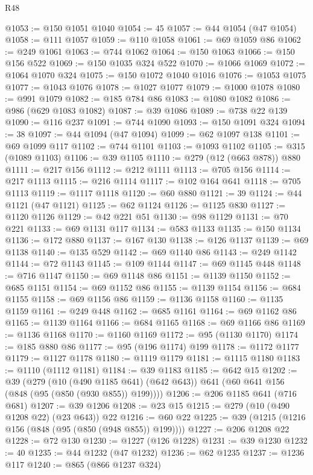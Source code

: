 \begin{lexlean}{R48}
\begin{coremodule}
@1053 := @150 @1051 @1040
@1054 := 45
@1057 := @44 @1054 (@47 @1054)
@1058 := @111 @1057
@1059 := @110 @1058
@1061 := @69 @1059 @86
@1062 := @249 @1061
@1063 := @744 @1062
@1064 := @150 @1063
@1066 := @150 @156 @522
@1069 := @150 @1035 @324 @522
@1070 := @1066 @1069
@1072 := @1064 @1070 @324
@1075 := @150 @1072 @1040 @1016
@1076 := @1053 @1075
@1077 := @1043 @1076
@1078 := @1027 @1077
@1079 := @1000 @1078
@1080 := @991 @1079
@1082 := @185 @784 @86
@1083 := @1080 @1082
@1086 := @986 (@629 @1083 @1082)
@1087 := @39 @1086
@1089 := @738 @22 @139
@1090 := @116 @237
@1091 := @744 @1090
@1093 := @150 @1091 @324
@1094 := 38
@1097 := @44 @1094 (@47 @1094)
@1099 := @62 @1097 @138
@1101 := @69 @1099 @117
@1102 := @744 @1101
@1103 := @1093 @1102
@1105 := @315 (@1089 @1103)
@1106 := @39 @1105
@1110 := @279 (@12 (@663 @878)) @880
@1111 := @217 @156
@1112 := @212 @1111
@1113 := @705 @156
@1114 := @217 @1113
@1115 := @216 @1114
@1117 := @102 @164 @641
@1118 := @705 @1113
@1119 := @1117 @1118
@1120 := @60 @880
@1121 := 39
@1124 := @44 @1121 (@47 @1121)
@1125 := @62 @1124
@1126 := @1125 @830
@1127 := @1120 @1126
@1129 := @42 @221 @51
@1130 := @98 @1129
@1131 := @70 @221
@1133 := @69 @1131 @117
@1134 := @583 @1133
@1135 := @150 @1134
@1136 := @172 @880
@1137 := @167 @130
@1138 := @126 @1137
@1139 := @69 @1138
@1140 := @135 @529
@1142 := @69 @1140 @86
@1143 := @249 @1142
@1144 := @72 @1143
@1145 := @109 @1144
@1147 := @69 @1145 @448
@1148 := @716 @1147
@1150 := @69 @1148 @86
@1151 := @1139 @1150
@1152 := @685 @1151
@1154 := @69 @1152 @86
@1155 := @1139 @1154
@1156 := @684 @1155
@1158 := @69 @1156 @86
@1159 := @1136 @1158
@1160 := @1135 @1159
@1161 := @249 @448
@1162 := @685 @1161
@1164 := @69 @1162 @86
@1165 := @1139 @1164
@1166 := @684 @1165
@1168 := @69 @1166 @86
@1169 := @1136 @1168
@1170 := @1160 @1169
@1172 := @95 (@1130 @1170)
@1174 := @185 @880 @86
@1177 := @95 (@196 @1174) @199
@1178 := @1172 @1177
@1179 := @1127 @1178
@1180 := @1119 @1179
@1181 := @1115 @1180
@1183 := @1110 (@1112 @1181)
@1184 := @39 @1183
@1185 := @642 @15
@1202 := @39
    (@279
      (@10 (@490 @1185 @641) (@642 @643))
      @641
      (@60 @641 @156 (@848 (@95 (@850 (@930 @855)) @199))))
@1206 := @206 @1185 @641 (@716 @681)
@1207 := @39 @1206
@1208 := @23 @15
@1215 := @279 (@10 (@490 @1208 @22) (@23 @643)) @22
@1216 := @60 @22
@1225 := @39 (@1215 (@1216 @156 (@848 (@95 (@850 (@948 @855)) @199))))
@1227 := @206 @1208 @22
@1228 := @72 @130
@1230 := @1227 (@126 @1228)
@1231 := @39 @1230
@1232 := 40
@1235 := @44 @1232 (@47 @1232)
@1236 := @62 @1235
@1237 := @1236 @117
@1240 := @865 (@866 @1237 @324)

\end{coremodule}
\end{lexlean}

